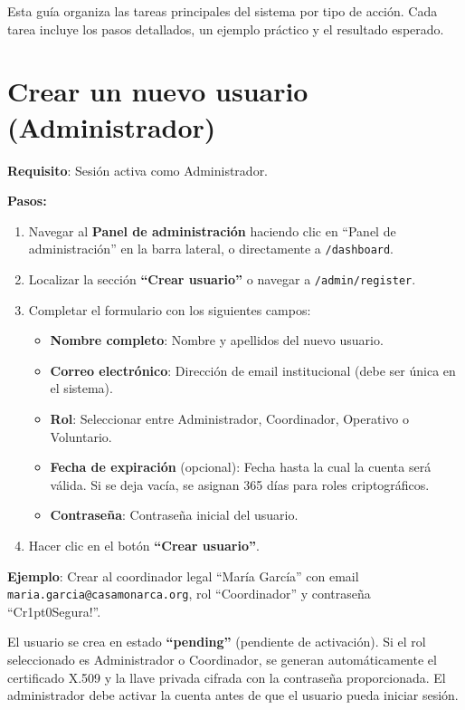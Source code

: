 \documentclass[10pt,letterpaper]{report}
\begin{document}
Esta guía organiza las tareas principales del sistema por tipo de acción. Cada tarea incluye los pasos detallados, un ejemplo práctico y el resultado esperado.

\section{Crear un nuevo usuario (Administrador)}

\textbf{Requisito}: Sesión activa como Administrador.

\textbf{Pasos:}
\begin{enumerate}[leftmargin=2cm]
  \item Navegar al \textbf{Panel de administración} haciendo clic en ``Panel de administración'' en la barra lateral, o directamente a \texttt{/dashboard}.
  \item Localizar la sección \textbf{``Crear usuario''} o navegar a \texttt{/admin/register}.
  \item Completar el formulario con los siguientes campos:
  \begin{itemize}
    \item \textbf{Nombre completo}: Nombre y apellidos del nuevo usuario.
    \item \textbf{Correo electrónico}: Dirección de email institucional (debe ser única en el sistema).
    \item \textbf{Rol}: Seleccionar entre Administrador, Coordinador, Operativo o Voluntario.
    \item \textbf{Fecha de expiración} (opcional): Fecha hasta la cual la cuenta será válida. Si se deja vacía, se asignan 365 días para roles criptográficos.
    \item \textbf{Contraseña}: Contraseña inicial del usuario.
  \end{itemize}
  \item Hacer clic en el botón \textbf{``Crear usuario''}.
\end{enumerate}

\textbf{Ejemplo}: Crear al coordinador legal ``María García'' con email \texttt{maria.garcia@casamonarca.org}, rol ``Coordinador'' y contraseña ``Cr1pt0Segura!''.

\begin{successbox}
  El usuario se crea en estado \textbf{``pending''} (pendiente de activación). Si el rol seleccionado es Administrador o Coordinador, se generan automáticamente el certificado X.509 y la llave privada cifrada con la contraseña proporcionada. El administrador debe activar la cuenta antes de que el usuario pueda iniciar sesión.
\end{successbox}
\end{document}
